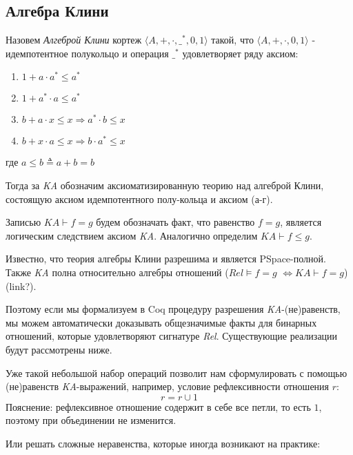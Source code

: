 \documentclass[times
              ]{itmo-student-thesis}
\begin{document}
    \subsection{Алгебра Клини}
      Назовем \textit{Алгеброй Клини} кортеж $\langle A,+,\cdot,\_^*,0,1\rangle$ такой, что $\langle A, +, \cdot, 0, 1 \rangle$ - идемпотентное полукольцо и операция $ \_^* $ удовлетворяет ряду аксиом:
      \begin{enumerate}
        \item $ 1 + a \cdot a^* \leq a^* $
        \item $ 1 + a^* \cdot a \leq a^* $
        \item $ b + a \cdot x \leq x \Rightarrow a^* \cdot b \leq x $
        \item $ b + x \cdot a \leq x \Rightarrow b \cdot a^* \leq x $
      \end{enumerate}
      где  $ a \leq b \triangleq a + b = b$

      Тогда за \textit{KA} обозначим аксиоматизированную теорию над алгеброй Клини, состоящую аксиом
      идемпотентного полу-кольца и аксиом (а-г).

      Записью $ \mathit{KA} \vdash f = g $ будем обозначать факт, что равенство $ f = g $, является
      логическим следствием аксиом \textit{KA}.
      Аналогично определим $ \mathit{KA} \vdash f \leq g $.

      Известно, что теория алгебры Клини разрешима и является PSpace-полной\cite{word_problem_pspace}.
      Также \textit{KA} полна относительно алгебры отношений
      ($ \mathit{Rel} \models f = g $ $ \Leftrightarrow \mathit{KA} \vdash f = g$) (link?).

      Поэтому если мы формализуем в Coq процедуру разрешения \textit{KA}-(не)равенств, мы можем
      автоматически доказывать общезначимые факты для бинарных отношений, которые удовлетворяют
      сигнатуре \textit{Rel}.
      Существующие реализации будут рассмотрены ниже.

      Уже такой небольшой набор операций позволит нам сформулировать с помощью (не)равенств
      \textit{KA}-выражений, например, условие рефлексивности отношения $ r $:
      $$ r = r \cup 1 $$
      Пояснение: рефлексивное отношение содержит в себе все петли, то есть $ 1 $, поэтому при
      объединении не изменится.

      Или решать сложные неравенства, которые иногда возникают на практике:
\end{document}
